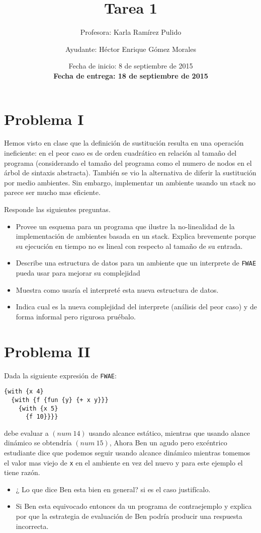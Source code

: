 \documentclass{article}
\author{Profesora: Karla Ramírez Pulido \and
  Ayudante: Héctor Enrique Gómez Morales}
\title{Tarea 1}
\date{Fecha de inicio: 8 de septiembre de 2015\\
  \textbf{Fecha de entrega: 18 de septiembre de 2015}}
\begin{document}
\maketitle
\section{Problema I}

Hemos visto en clase que la definición de sustitución resulta en una operación ineficiente: en el peor caso es de orden cuadrático en relación al tamaño del programa (considerando el tamaño del programa como el numero de nodos en el árbol de sintaxis abstracta). También se vio la alternativa de diferir la sustitución por medio ambientes. Sin embargo, implementar un ambiente usando un stack no parece ser mucho mas eficiente.

Responde las siguientes preguntas.
\begin{itemize}
\item Provee un esquema para un programa que ilustre la no-linealidad de la implementación de ambientes basada en un stack. Explica brevemente porque su ejecución en tiempo no es lineal con respecto al tamaño de su entrada.
\item Describe una estructura de datos para un ambiente que un interprete de \texttt{FWAE} pueda usar para mejorar su complejidad
\item Muestra como usaría el interpreté esta nueva estructura de datos.
\item Indica cual es la nueva complejidad del interprete (análisis del peor caso) y de forma informal pero rigurosa pruébalo.
\end{itemize}

\section{Problema II}
Dada la siguiente expresión de \texttt{FWAE}:
\begin{verbatim}
{with {x 4}
  {with {f {fun {y} {+ x y}}}
    {with {x 5}
      {f 10}}}}
\end{verbatim}
debe evaluar a $(num\ 14)$ usando alcance estático, mientras que usando alance dinámico se obtendría $(num\ 15)$, Ahora Ben un agudo pero excéntrico estudiante dice que podemos seguir usando alcance dinámico mientras tomemos el valor mas viejo de \verb;x; en el ambiente en vez del nuevo y para este ejemplo el tiene razón.
\begin{itemize}
\item{¿ Lo que dice Ben esta bien en general? si es el caso justifícalo. }
\item{Si Ben esta equivocado entonces da un programa de contraejemplo y explica
por que la estrategia de evaluación de Ben podría producir una respuesta incorrecta.}
\end{itemize}
\end{document}
